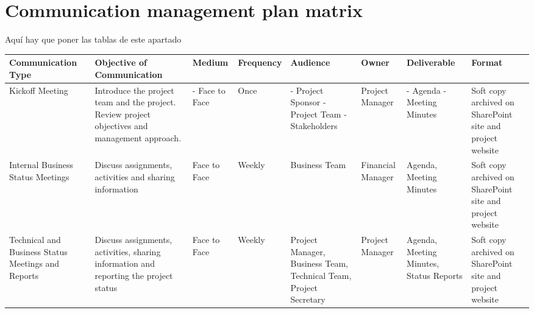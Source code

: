 \section{Communication management plan matrix}
\begin{landscape}
	
Aquí hay que poner las tablas de este apartado

\begin{table}[H]
	\centering
	\begin{tabular}{| >{\raggedright\arraybackslash}p{2.8cm}  | >{\raggedright\arraybackslash}p{3.2cm} | >{\raggedright\arraybackslash}p{2.4cm} | >{\raggedright\arraybackslash}p{1.8cm} | >{\raggedright\arraybackslash}p{2.4cm} | >{\raggedright\arraybackslash}p{1.8cm} | >{\raggedright\arraybackslash}p{2cm} | >{\raggedright\arraybackslash}p{2.8cm} |  }
		

\toprule [2pt]
		\textbf{Communication Type} & \textbf{Objective of Communication} & \textbf{Medium}  &\textbf{Frequency} &\textbf{Audience}& \textbf{Owner}& \textbf{Deliverable} &\textbf{Format} \\  
\midrule [1.5pt]
	
		Kickoff Meeting & Introduce the project team and the project. Review project objectives and management approach.  &  - Face to Face  & Once  &  - Project Sponsor \newline - Project Team \newline - Stakeholders   & Project Manager  & - Agenda \newline - Meeting Minutes & Soft copy archived on SharePoint site and project website\\  
		
		\hline
		
		Internal Business Status Meetings& Discuss assignments, activities and sharing information  & Face to Face   &  Weekly &Business Team     & Financial Manager  & Agenda, Meeting Minutes  &Soft copy archived on SharePoint site and project website\\  
		
		\hline
		
		Technical and Business Status Meetings and Reports&Discuss assignments, activities, sharing information and reporting the project status   &Face to Face    & Weekly  & Project Manager, Business Team, Technical Team, Project Secretary    &Project Manager   & Agenda, Meeting Minutes, Status Reports  &Soft copy archived on SharePoint site and project website\\  
		

\end{tabular}
\end{table}
\end{landscape}
